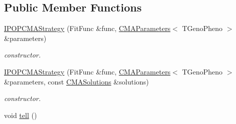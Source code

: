 \subsection*{Public Member Functions}
\begin{DoxyCompactItemize}
\item 
\hyperlink{classlibcmaes_1_1IPOPCMAStrategy_a0fad3e1160695878d2d8075a4cddf786}{I\+P\+O\+P\+C\+M\+A\+Strategy} (Fit\+Func \&func, \hyperlink{classlibcmaes_1_1CMAParameters}{C\+M\+A\+Parameters}$<$ T\+Geno\+Pheno $>$ \&parameters)
\begin{DoxyCompactList}\small\item\em constructor. \end{DoxyCompactList}\item 
\hyperlink{classlibcmaes_1_1IPOPCMAStrategy_aa904db73802865f6a83d3ad05710bc67}{I\+P\+O\+P\+C\+M\+A\+Strategy} (Fit\+Func \&func, \hyperlink{classlibcmaes_1_1CMAParameters}{C\+M\+A\+Parameters}$<$ T\+Geno\+Pheno $>$ \&parameters, const \hyperlink{classlibcmaes_1_1CMASolutions}{C\+M\+A\+Solutions} \&solutions)
\begin{DoxyCompactList}\small\item\em constructor. \end{DoxyCompactList}\item 
\hypertarget{classlibcmaes_1_1IPOPCMAStrategy_a9b3b59e7caf752f48b37500d84736137}{void \hyperlink{classlibcmaes_1_1IPOPCMAStrategy_a9b3b59e7caf752f48b37500d84736137}{tell} ()}\label{classlibcmaes_1_1IPOPCMAStrategy_a9b3b59e7caf752f48b37500d84736137}


\end{DoxyCompactItemize}
